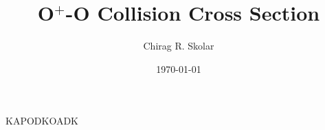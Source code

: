 \documentclass{report}
\title{O$^+$-O Collision Cross Section}
\author{Chirag R. Skolar}
\date{\today}
\begin{document}
	\maketitle
	
	\tableofcontents
	
	
	
	
	
	
		
	
	
	KAPODKOADK \cite{goodwin2018_dissertation}
	
	
	
	
	
	
	
	\begin{appendices}
		
		
	\end{appendices}
	
\end{document}
